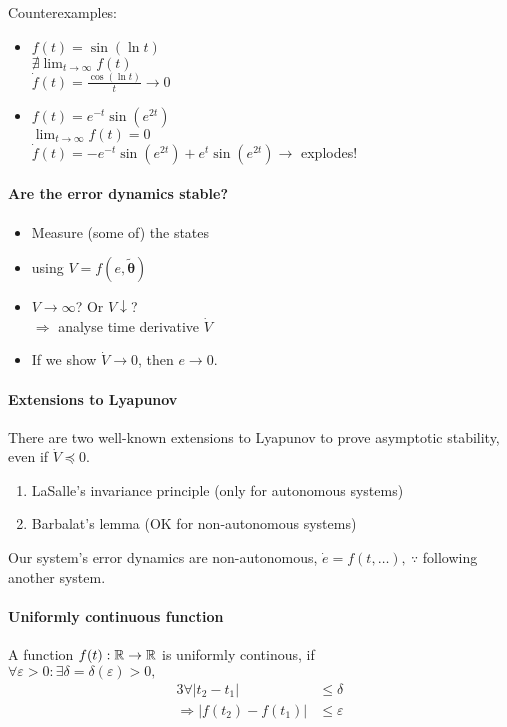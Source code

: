 Counterexamples:
\begin{itemize}
\item $f(t) = \sin \left( \ln t \right)$ \\
    $\nexists \lim_{t \rightarrow \infty} f(t)$\\
    $ \dot{f}(t) = \frac{\cos \left( \ln t \right)}{t} \rightarrow 0$
\item $f(t) = e^{-t} \sin (e^{2t})$\\
    $\lim_{t \rightarrow \infty} f(t) = 0$\\
    $\dot{f}(t) = -e^{-t}\sin(e^{2t}) + e^t \sin(e^{2t}) \rightarrow$
    explodes!
\end{itemize}

\paragraph{Are the error dynamics stable?}
\begin{itemize}
\item Measure (some of) the states
\item using $V = f(e, \tilde{\bm{\theta}})$
\item $V \rightarrow \infty$? Or $V \downarrow$?\\
    $\Rightarrow$ analyse time derivative $\dot{V}$
\item If we show $\dot{V} \rightarrow 0$, then $e \rightarrow 0$.
\end{itemize}

\paragraph{Extensions to Lyapunov}
There are two well-known extensions to Lyapunov to prove
asymptotic stability, even if $\dot{V} \preceq 0$.
\begin{enumerate}
\item LaSalle's invariance principle
    (only for autonomous systems)
\item Barbalat's lemma
    (OK for non-autonomous systems)
\end{enumerate}

Our system's error dynamics are non-autonomous,
$\dot{e} = f(t, \dots), ~ \because$
following another system.
\begin{figure}[H]
\centering
{}
\end{figure}

\paragraph{Uniformly continuous function}
A function $f(t): \mathbb{R} \rightarrow \mathbb{R}$ 
is uniformly continous, if\\
$\forall \varepsilon>0: \exists \delta = \delta(\varepsilon) >0,$
\begin{alignat*}{3}
\forall |t_2 - t_1| &\leq \delta\\
\Rightarrow |  f(t_2) - f(t_1) | &\leq \varepsilon
\end{alignat*}

